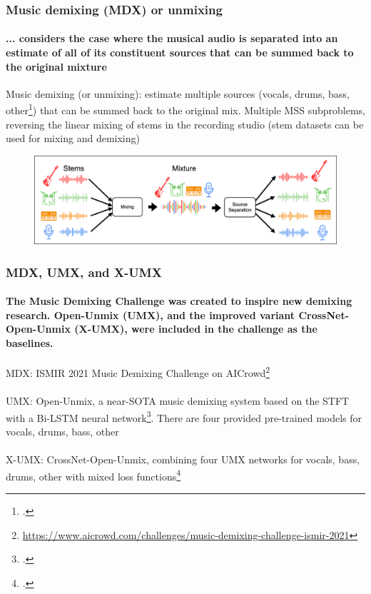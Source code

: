 \documentclass[usenames,dvipsnames]{beamer}
\begin{document}
\begin{frame}
	\frametitle{Music demixing (MDX) or unmixing}
	\framesubtitle{... considers the case where the musical audio is separated into an estimate of all of its constituent sources that can be summed back to the original mixture}
	Music demixing (or unmixing): estimate multiple sources (vocals, drums, bass, other\footcite{musdb18hq}) that can be summed back to the original mix. Multiple MSS subproblems, reversing the linear mixing of stems in the recording studio (stem datasets can be used for mixing and demixing)
	\begin{figure}[ht]
		\centering
		\includegraphics[width=12cm]{./images-mss/mixdemix.png}
	\end{figure}
\end{frame}

\begin{frame}
	\frametitle{MDX, UMX, and X-UMX}
	\framesubtitle{The Music Demixing Challenge was created to inspire new demixing research. Open-Unmix (UMX), and the improved variant CrossNet-Open-Unmix (X-UMX), were included in the challenge as the baselines.}
	MDX: ISMIR 2021 Music Demixing Challenge on AICrowd\footnote{\url{https://www.aicrowd.com/challenges/music-demixing-challenge-ismir-2021}}\\\ \\
	UMX: Open-Unmix, a near-SOTA music demixing system based on the STFT with a Bi-LSTM neural network\footcite{umx}. There are four provided pre-trained models for vocals, drums, bass, other\\\ \\
	X-UMX: CrossNet-Open-Unmix, combining four UMX networks for vocals, bass, drums, other with mixed loss functions\footcite{xumx}
\end{frame}
\end{document}
